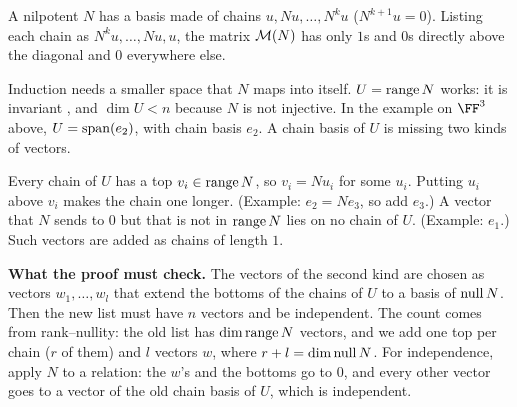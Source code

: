 \documentclass[10pt]{scrartcl}
\begin{document}
\begin{theorem*}\hypertarget{prop-75}{}\label{prop-75}
  A nilpotent $N$ has a basis made of chains $u,Nu,\dots,N^ku$ ($N^{k+1}u=0$). Listing each chain as $N^ku,\dots,Nu,u$, the matrix $\mathcal M(N)$ has only $1$s and $0$s directly above the diagonal and $0$ everywhere else.
\end{theorem*}
\begin{ideabox}
Induction needs a smaller space that $N$ maps into itself. $U=\operatorname{range} N$ works: it is invariant , and $\dim U<n$ because $N$ is not injective. In the example on $\FF^3$ above, $U=\operatorname{span}(e_2)$, with chain basis $e_2$. A chain basis of $U$ is missing two kinds of vectors.
\begin{itemize}
  \ii Every chain of $U$ has a top $v_i\in\operatorname{range} N$, so $v_i=Nu_i$ for some $u_i$. Putting $u_i$ above $v_i$ makes the chain one longer. (Example: $e_2=Ne_3$, so add $e_3$.)
  \ii A vector that $N$ sends to $0$ but that is not in $\operatorname{range} N$ lies on no chain of $U$. (Example: $e_1$.) Such vectors are added as chains of length $1$.
\end{itemize}
\end{ideabox}
\textbf{What the proof must check.} The vectors of the second kind are chosen as vectors $w_1,\dots,w_l$ that extend the bottoms of the chains of $U$ to a basis of $\operatorname{null} N$. Then the new list must have $n$ vectors and be independent. The count comes from rank--nullity: the old list has $\dim\operatorname{range} N$ vectors, and we add one top per chain ($r$ of them) and $l$ vectors $w$, where $r+l=\dim\operatorname{null} N$. For independence, apply $N$ to a relation: the $w$'s and the bottoms go to $0$, and every other vector goes to a vector of the old chain basis of $U$, which is independent.
\end{document}

